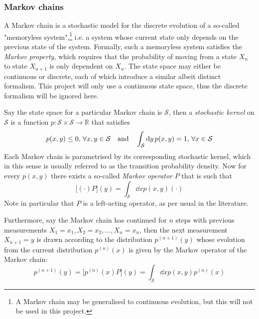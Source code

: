 \documentclass[nofootinbib,reprint,english]{revtex4-1}
\newcommand{\Sspace}{\mathcal{S}}
\begin{document}
\subsubsection{Markov chains}
A Markov chain is a stochastic model for the discrete evolution of a so-called "memoryless system",\footnote{A Markov chain may be generalised to continuous evolution, but this will not be used in this project.} i.e. a system whose current state only depends on the previous state of the system. Formally, such a memoryless system satisfies the \emph{Markov property}, which requires that the probability of moving from a state \(X_n\) to state \(X_{n+1}\) is only dependent on \(X_n\). The state space may either be continuous or discrete, each of which introduce a similar albeit distinct formalism. This project will only use a continuous state space, thus the discrete formalism will be ignored here.

Say the state space for a particular Markov chain is \(\mathcal{S}\), then a \emph{stochastic kernel} on \(\Sspace\) is a function \(p:\Sspace\times\Sspace\to\mathbb{R}\) that satisfies
\[p(x,y)\leq0,\,\forall x,y\in\Sspace\qand\int_\Sspace\dd{y}p(x,y)=1,\,\forall x\in\Sspace\]
Each Markov chain is parametrised by its corresponding stochastic kernel, which in this sense is usually referred to as the transition probability density. Now for every \(p(x,y)\) there exists a so-called \emph{Markov operator} \(P\) that is such that
\[\big[(\cdot)P\big](y)=\int_\Sspace\dd{x}p(x,y)(\cdot)\]
Note in particular that \(P\) is a left-acting operator, as per usual in the literature.

Furthermore, say the Markov chain has continued for \(n\) steps with previous measurements \(X_1=x_1,X_2=x_2,\ldots,X_n=x_n\), then the next measurement \(X_{n+1}=y\) is drawn according to the distribution \(p^{(n+1)}(y)\) whose evolution from the current distribution \(p^{(n)}(x)\) is given by the Markov operator of the Markov chain:
\begin{equation}\label{eq:Markov_Chain_next_distribution}
p^{(n+1)}(y)=\big[p^{(n)}(x)P\big](y)=\int_\Sspace\dd{x}p(x,y)p^{(n)}(x)
\end{equation}
\end{document}
